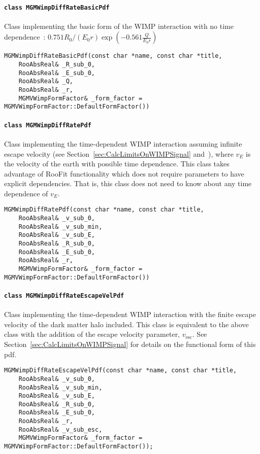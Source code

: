 			\paragraph{\lstinline!class MGMWimpDiffRateBasicPdf!}
Class implementing the basic form of the WIMP interaction with no time dependence~\cite{Lew96}: $0.751 R_{0}/(E_{0} r) \exp(-0.561 \frac{Q}{E_{0} r })$
				\begin{lstlisting}
MGMWimpDiffRateBasicPdf(const char *name, const char *title,
	RooAbsReal& _R_sub_0,
	RooAbsReal& _E_sub_0,
	RooAbsReal& _Q,
	RooAbsReal& _r,
	MGMVWimpFormFactor& _form_factor = MGMVWimpFormFactor::DefaultFormFactor())
				\end{lstlisting}	

			\paragraph{\lstinline!class MGMWimpDiffRatePdf!}
Class implementing the time-dependent WIMP interaction assuming infinite escape velocity (see Section~\ref{sec:CalcLimitsOnWIMPSignal} and~\cite{Jun96,Lew96}), where $v_{E}$ is the velocity of the earth with possible time dependence.  This class takes advantage of RooFit functionality which does not require parameters to have explicit dependencies.  That is, this class does not need to know about any time dependence of $v_{E}$.
				\begin{lstlisting}
MGMWimpDiffRatePdf(const char *name, const char *title,
	RooAbsReal& _v_sub_0,
	RooAbsReal& _v_sub_min,
	RooAbsReal& _v_sub_E,
	RooAbsReal& _R_sub_0,
	RooAbsReal& _E_sub_0,
	RooAbsReal& _r,
	MGMVWimpFormFactor& _form_factor = MGMVWimpFormFactor::DefaultFormFactor())
				\end{lstlisting}	
						
			\paragraph{\lstinline!class MGMWimpDiffRateEscapeVelPdf!}
Class implementing the time-dependent WIMP interaction with the finite escape velocity of the dark matter halo included.  This class is equivalent to the above class with the addition of the escape velocity parameter, $v_{\text{esc}}$.  See Section~\ref{sec:CalcLimitsOnWIMPSignal} for details on the functional form of this pdf.
				\begin{lstlisting}
MGMWimpDiffRateEscapeVelPdf(const char *name, const char *title,
	RooAbsReal& _v_sub_0,
	RooAbsReal& _v_sub_min,
	RooAbsReal& _v_sub_E,
	RooAbsReal& _R_sub_0,
	RooAbsReal& _E_sub_0,
	RooAbsReal& _r,
	RooAbsReal& _v_sub_esc,
	MGMVWimpFormFactor& _form_factor = MGMVWimpFormFactor::DefaultFormFactor());
				\end{lstlisting}	

